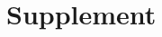 \documentclass[12pt]{article}
\begin{document}
\section{Supplement}



\clearpage

\printbibliography
\end{document}

